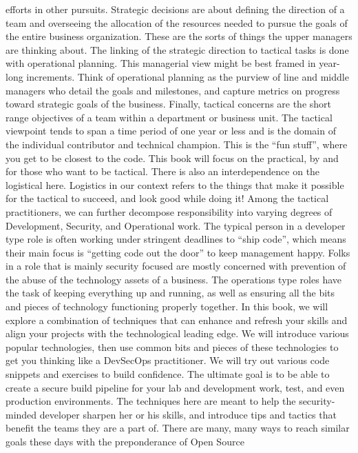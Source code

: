 efforts in other pursuits.
\justify{}
Strategic decisions are about defining the direction of a team and overseeing
the allocation of the resources needed to pursue the goals of the entire
business organization. These are the sorts of things the upper managers are
thinking about. The linking of the strategic direction to tactical tasks is
done with operational planning. This managerial view might be best framed in
year-long increments. Think of operational planning as the purview of line
and middle managers who detail the goals and milestones, and capture metrics
on progress toward strategic goals of the business. Finally, tactical concerns
are the short range objectives of a team within a department or business unit.
The tactical viewpoint tends to span a time period of one year or less and is
the domain of the individual contributor and technical champion. This is the
``fun stuff'', where you get to be closest to the code. This book will focus
on the practical, by and for those who want to be tactical. There is also
an interdependence on the logistical here. Logistics in our context refers to
the things that make it possible for the tactical to succeed, and look good
while doing it!
\justify{}
Among the tactical practitioners, we can further decompose responsibility into
varying degrees of Development, Security, and Operational work. The typical
person in a developer type role is often working under stringent deadlines to 
``ship code'', which means their main focus is ``getting code out the door'' to
keep management happy. Folks in a role that is mainly security focused are mostly
concerned with prevention of the abuse of the technology assets of a business. The
operations type roles have the task of keeping everything up and running, as well as
ensuring all the bits and pieces of technology functioning properly together.  
\justify{}
In this book, we will explore a combination of techniques that can enhance and refresh
your skills and align your projects with the technological leading edge. We will
introduce various popular technologies, then use common bits and pieces of
these technologies to get you thinking like a DevSecOps practitioner. We will try out
various code snippets and exercises to build confidence. The ultimate goal is to be able to
create a secure build pipeline for your lab and development work,
test, and even production environments. The techniques here are meant to help
the security-minded developer sharpen her or his skills, and introduce tips
and tactics that benefit the teams they are a part of. There are many, many
ways to reach similar goals these days with the preponderance of Open Source
